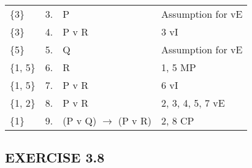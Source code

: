 \documentclass[a4paper,12pt]{article}
\newcommand{\mra}{$\rightarrow$ }
\begin{document}
\begin{enumerate}[label=\arabic*,leftmargin=*]
\begin{enumerate}[label=\arabic*.]
\begin{minipage}{\textwidth}
\begin{tabular}{l l l l}
                        \{3\} & 3. & P & Assumption for vE\\
                        \{3\} & 4. & P v R & 3 vI\\
                        \{5\} & 5. & Q & Assumption for vE\\
                        \{1, 5\} & 6. & R & 1, 5 MP\\
                        \{1, 5\} & 7. & P v R & 6 vI\\
                        \{1, 2\} & 8. & P v R & 2, 3, 4, 5, 7 vE\\
                        \{1\} & 9. & (P v Q) \mra (P v R) & 2, 8 CP\\
                    \end{tabular}
                \end{minipage}

        \end{enumerate}
    \end{enumerate}

    \subsection*{EXERCISE 3.8}
\end{document}
